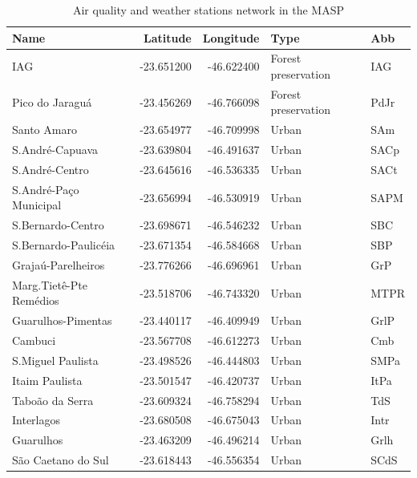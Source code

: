   \begin{table}[!ht]
  	\centering
	\caption{Air quality and weather stations network in the MASP}
	\label{tab:masp_stations}
  	\begin{tabular}{lrrll}
	\toprule
                       Name &   Latitude &  Longitude &                 Type &    Abb \\
	\midrule
                        IAG & -23.651200 & -46.622400 &  Forest preservation &    IAG \\
            Pico do Jaraguá & -23.456269 & -46.766098 &  Forest preservation &   PdJr \\
                Santo Amaro & -23.654977 & -46.709998 &                Urban &    SAm \\
            S.André-Capuava & -23.639804 & -46.491637 &                Urban &   SACp \\
             S.André-Centro & -23.645616 & -46.536335 &                Urban &   SACt \\
     S.André-Paço Municipal & -23.656994 & -46.530919 &                Urban &   SAPM \\
          S.Bernardo-Centro & -23.698671 & -46.546232 &                Urban &    SBC \\
       S.Bernardo-Paulicéia & -23.671354 & -46.584668 &                Urban &    SBP \\
         Grajaú-Parelheiros & -23.776266 & -46.696961 &                Urban &    GrP \\
    Marg.Tietê-Pte Remédios & -23.518706 & -46.743320 &                Urban &   MTPR \\
         Guarulhos-Pimentas & -23.440117 & -46.409949 &                Urban &   GrlP \\
                    Cambuci & -23.567708 & -46.612273 &                Urban &    Cmb \\
          S.Miguel Paulista & -23.498526 & -46.444803 &                Urban &   SMPa \\
             Itaim Paulista & -23.501547 & -46.420737 &                Urban &   ItPa \\
            Taboão da Serra & -23.609324 & -46.758294 &                Urban &    TdS \\
                 Interlagos & -23.680508 & -46.675043 &                Urban &   Intr \\
                  Guarulhos & -23.463209 & -46.496214 &                Urban &   Grlh \\
         São Caetano do Sul & -23.618443 & -46.556354 &                Urban &   SCdS \\

\end{tabular}
\end{table}
